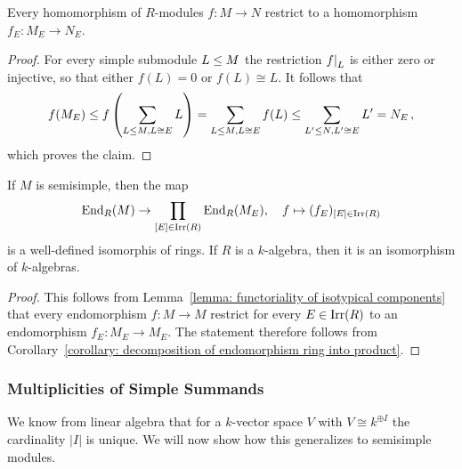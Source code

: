 \begin{lemma}
  \label{lemma: functoriality of isotypical components}
  Every homomorphism of $R$-modules $f \colon M \to N$ restrict to a homomorphism $f_E \colon M_E \to N_E$.
\end{lemma}


\begin{proof}
  For every simple submodule $L \leq M$ the restriction $\restrict{f}{L}$ is either zero or injective, so that either $f(L) = 0$ or $f(L) \cong L$.
  It follows that
  \[
              f(M_E)
    \leq f\left(\sum_{L \leq M, L \cong E} L \right)
    =         \sum_{L \leq M, L \cong E} f(L)
    \leq \sum_{L' \leq N, L' \cong E} L'
    =         N_E \,,
  \]
  which proves the claim.
\end{proof}




\begin{corollary}
  \label{corollary: endomorphism ring of semisimple module}
  If $M$ is semisimple, then the map
  \[
            \operatorname{End}_R(M)
    \to     \prod_{[E] \in \operatorname{Irr}(R)} \operatorname{End}_R(M_E),
    \quad   f
    \mapsto (f_E)_{[E] \in \operatorname{Irr}(R)}
  \]
  is a well-defined isomorphis of rings.
  If $R$ is a $k$-algebra, then it is an isomorphism of $k$-algebras.
\end{corollary}


\begin{proof}
  This follows from Lemma~\ref{lemma: functoriality of isotypical components} that every endomorphism $f \colon M \to M$ restrict for every $E \in \operatorname{Irr}(R)$ to an endomorphism $f_E \colon M_E \to M_E$.
  The statement therefore follows from Corollary~\ref{corollary: decomposition of endomorphism ring into product}.
\end{proof}





\subsubsection{Multiplicities of Simple Summands}


\begin{fluff}
  We know from linear algebra that for a $k$-vector space $V$ with $V \cong k^{\oplus I}$ the cardinality $|I|$ is unique.
  We will now show how this generalizes to semisimple modules.
\end{fluff}


